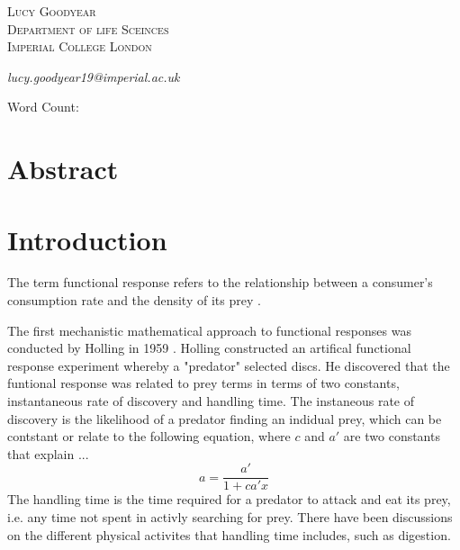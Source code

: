 \documentclass[11pt, a4paper, titlepage]{article}
\begin{document}
\begin{titlepage}
	
	
	
	\vspace{0.5\baselineskip} %
	
	{\scshape\Large Lucy Goodyear\\
		Department of life Sceinces \\
		Imperial College London\\} %
	
	\textit{lucy.goodyear19@imperial.ac.uk}
	\date{}
	
	\vspace*{3\baselineskip} %
	
	Word Count:
	
\end{titlepage}
	
\section*{Abstract}

\newpage

\section{Introduction}

The term functional response refers to the relationship between a consumer's consumption rate and the density of its prey \parencite{Solomon1949}. 

The first mechanistic mathematical approach to functional responses was conducted by Holling in 1959 \parencite{Holling1959b}. Holling constructed an artifical functional response experiment whereby a "predator" selected discs. He discovered that the funtional response was related to prey terms in terms of two constants, instantaneous rate of discovery and handling time. The instaneous rate of discovery is the likelihood of a predator finding an indidual prey, which can be contstant or relate to the following equation, where $c$ and $a'$ are two constants that explain ...\parencite{Holling1959b}
\begin{equation}
a = \frac{a'}{1 + ca'x}
\end{equation}
The handling time is the time required for a predator to attack and eat its prey, i.e. any time not spent in activly searching for prey. There have been discussions on the different physical activites that handling time includes, such as digestion. \parencite{something!, something else!}
\end{document}
